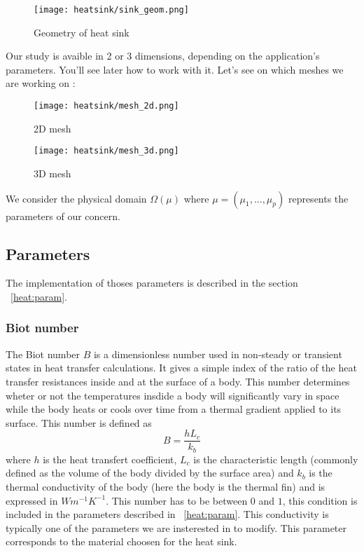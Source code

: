 \begin{figure}[!h]
\centering
\texttt{[image: heatsink/sink\_geom.png]}
\caption{Geometry of heat sink}
\end{figure}

Our study is avaible in 2 or 3 dimensions, depending on the application's parameters. You'll see later how to work with it. Let's see on which meshes we are working on :
\begin{figure}[!h]
\begin{minipage}[b]{.50\linewidth}
\centering
\texttt{[image: heatsink/mesh\_2d.png]}
\caption{2D mesh}
\end{minipage}
\begin{minipage}[b]{.50\linewidth}
\centering
\texttt{[image: heatsink/mesh\_3d.png]}
\caption{3D mesh}
\end{minipage}
\end{figure}

We consider the physical domain $\varOmega (\mu)$ where $\mu = (\mu_1, ...,\mu_p)$ represents the parameters of our concern. 

\subsection{Parameters}
The implementation of thoses parameters is described in the section ~\ref{heat:param}.

\subsubsection{Biot number}
The Biot number $B$ is a dimensionless number used in non-steady or transient states in heat transfer calculations. It gives a simple index of the ratio of the heat transfer resistances inside  and at the surface of a body. This number determines wheter or not the temperatures insdide a body will significantly vary in space while the body heats or cools over time from a thermal gradient applied to its surface. This number is defined as 
\begin{equation}
B = \frac{hL_c}{k_b}
\end{equation} 
where $h$ is the heat transfert coefficient, $L_c$ is the characteristic length (commonly defined as the volume of the body divided by the surface area) and $k_b$ is the thermal conductivity of the body (here the body is the thermal fin) and is expressed in $Wm^{-1}K^{-1}$. This number has to be between $0$ and $1$, this condition is included in the parameters described in ~\ref{heat:param}. This conductivity is typically one of the parameters we are insterested in to modify. This parameter corresponds to the material choosen for the heat sink. 

